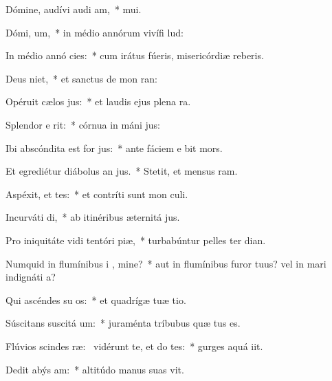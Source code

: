 \item Dómine, audívi audi am,~*  mui.
\item Dómi,  um,~* in médio annórum vivífi lud:
\item In médio annó  cies:~* cum irátus fúeris, misericórdiæ reberis.
\item Deus   niet,~* et sanctus de mon ran:
\item Opéruit cælos  jus:~* et laudis ejus plena  ra.
\item Splendor e   rit:~* córnua in máni jus:
\item Ibi abscóndita est for jus:~* ante fáciem e bit mors.
\item Et egrediétur diábolus an  jus.~* Stetit, et mensus  ram.
\item Aspéxit, et  tes:~* et contríti sunt mon culi.
\item Incurváti   di,~* ab itinéribus æternitá jus.
\item Pro iniquitáte vidi tentóri piæ,~* turbabúntur pelles ter dian.
\item Numquid in flumínibus i , mine?~* aut in flumínibus furor tuus? vel in mari indignáti a?
\item Qui ascéndes su  os:~* et quadrígæ tuæ tio.
\item Súscitans suscitá  um:~* juraménta tríbubus quæ tus es.
\item Flúvios scindes ræ:~\pscross{} vidérunt te, et do tes:~* gurges aquá iit.
\item Dedit abýs  am:~* altitúdo manus suas vit.
